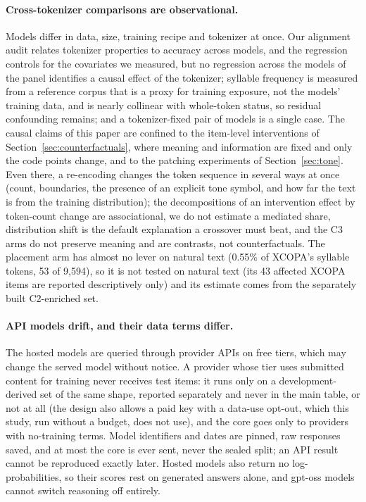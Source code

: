 \paragraph{Cross-tokenizer comparisons are observational.}
Models differ in data, size, training recipe and tokenizer at once. Our alignment audit relates tokenizer properties to accuracy across models, and the regression controls for the covariates we measured, but no regression across the  models of the panel identifies a causal effect of the tokenizer; syllable frequency is measured from a reference corpus that is a proxy for training exposure, not the models' training data, and is nearly collinear with whole-token status, so residual confounding remains; and a tokenizer-fixed pair of models is a single case. The causal claims of this paper are confined to the item-level interventions of Section~\ref{sec:counterfactuals}, where meaning and information are fixed and only the code points change, and to the patching experiments of Section~\ref{sec:tone}. Even there, a re-encoding changes the token sequence in several ways at once (count, boundaries, the presence of an explicit tone symbol, and how far the text is from the training distribution); the decompositions of an intervention effect by token-count change are associational, we do not estimate a mediated share, distribution shift is the default explanation a crossover must beat, and the C3 arms do not preserve meaning and are contrasts, not counterfactuals. The placement arm has almost no lever on natural text (0.55\% of XCOPA's syllable tokens, 53 of 9,594), so it is not tested on natural text (its 43 affected XCOPA items are reported descriptively only) and its estimate comes from the separately built C2-enriched \noilai{} set.

\paragraph{API models drift, and their data terms differ.}
The  hosted models are queried through provider APIs on free tiers, which may change the served model without notice. A provider whose tier uses submitted content for training never receives test items: it runs only on a development-derived set of the same shape, reported separately and never in the main table, or not at all (the design also allows a paid key with a data-use opt-out, which this study, run without a budget, does not use), and the core goes only to providers with no-training terms. Model identifiers and dates are pinned, raw responses saved, and at most the core is ever sent, never the sealed split; an API result cannot be reproduced exactly later. Hosted models also return no log-probabilities, so their  scores rest on generated answers alone, and gpt-oss models cannot switch reasoning off entirely.

